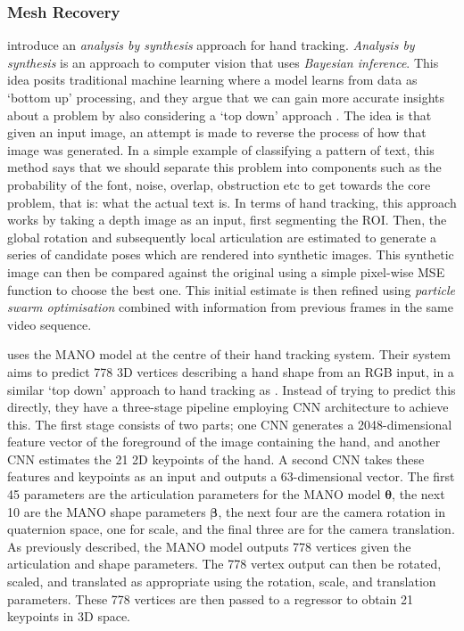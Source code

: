\subsubsection{Mesh Recovery}
\cite{sharp2015accurate} introduce an {\slshape analysis by synthesis} approach for hand tracking. {\slshape Analysis by synthesis} is an approach to computer vision that uses {\slshape Bayesian inference}. This idea posits traditional machine learning where a model learns from data as `bottom up' processing, and they argue that we can gain more accurate insights about a problem by also considering a `top down' approach \cite{yuille2006vision}. The idea is that given an input image, an attempt is made to reverse the process of how that image was generated. In a simple example of classifying a pattern of text, this method says that we should separate this problem into components such as the probability of the font, noise, overlap, obstruction etc to get towards the core problem, that is: what the actual text is. In terms of hand tracking, this approach works by taking a depth image as an input, first segmenting the ROI. Then, the global rotation and subsequently local articulation are estimated to generate a series of candidate poses which are rendered into synthetic images. This synthetic image can then be compared against the original using a simple pixel-wise MSE function to choose the best one. This initial estimate is then refined using {\slshape particle swarm optimisation} combined with information from previous frames in the same video sequence.

\cite{baek2019pushing} uses the MANO model \cite{romero2017embodied} at the centre of their hand tracking system. Their system aims to predict 778 3D vertices describing a hand shape from an RGB input, in a similar `top down' approach to hand tracking as \cite{sharp2015accurate}. Instead of trying to predict this directly, they have a three-stage pipeline employing CNN architecture to achieve this. The first stage consists of two parts; one CNN generates a 2048-dimensional feature vector of the foreground of the image containing the hand, and another CNN estimates the 21 2D keypoints of the hand. A second CNN takes these features and keypoints as an input and outputs a 63-dimensional vector. The first 45 parameters are the articulation parameters for the MANO model $\bm{\theta}$, the next 10 are the MANO shape parameters $\bm{\beta}$, the next four are the camera rotation in quaternion space, one for scale, and the final three are for the camera translation. As previously described, the MANO model outputs 778 vertices given the articulation and shape parameters. The 778 vertex output can then be rotated, scaled, and translated as appropriate using the rotation, scale, and translation parameters. These 778 vertices are then passed to a regressor to obtain 21 keypoints in 3D space.


